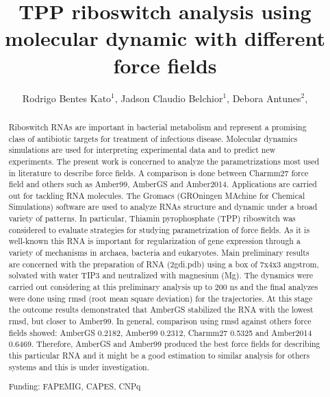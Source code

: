 \documentclass[twoside]{article}
\title{\vspace{-15mm}\fontsize{24pt}{10pt}\selectfont\textbf{ TPP riboswitch analysis using molecular dynamic with different force fields }} %
\author{ Rodrigo Bentes Kato$^{1}$, Jadson Claudio Belchior$^{1}$, Debora Antunes$^{2}$, }
\affil{ 1 UFMG

2 Instituição: Instituto Oswaldo Cruz - FIOCRUZ

 }
\date{}
\begin{document}
  
  
  \maketitle %
  
  
  \thispagestyle{fancy} %
  
  
  \begin{abstract}
  Riboswitch RNAs are important in bacterial metabolism and represent a promising class of antibiotic targets for treatment of infectious disease. Molecular dynamics simulations are used for interpreting experimental data and to predict new experiments. The present work is concerned to analyze the parametrizations most used in literature to describe force fields. A comparison is done between Charmm27 force field and others such as Amber99, AmberGS and Amber2014. Applications are carried out for tackling RNA molecules. The Gromacs (GROningen MAchine for Chemical Simulations) software are used to analyze RNAs structure and dynamic under a broad variety of patterns. In particular, Thiamin pyrophosphate (TPP) riboswitch was considered to evaluate strategies for studying parametrization of force fields. As it is well-known this RNA is important for regularization of gene expression through a variety of mechanisms in archaea, bacteria and eukaryotes. Main preliminary results are concerned with the preparation of RNA (2gdi.pdb) using a box of 7x4x3 angstrom, solvated with water TIP3 and neutralized with magnesium (Mg). The dynamics were carried out considering at this preliminary analysis up to 200 ns and the final analyzes were done using rmsd (root mean square deviation) for the trajectories. At this stage the outcome results demonstrated that AmberGS stabilized the RNA with the lowest rmsd, but closer to Amber99. In general, comparison using rmsd against others force fields showed: AmberGS 0.2182, Amber99 0.2312, Charmm27 0.5325 and Amber2014 0.6469. Therefore, AmberGS and Amber99 produced the best force fields for describing this particular RNA and it might be a good estimation to similar analysis for others systems and this is under investigation.
  
  Funding: FAPEMIG, CAPES, CNPq \\ 
  \end{abstract}
  
\end{document}
